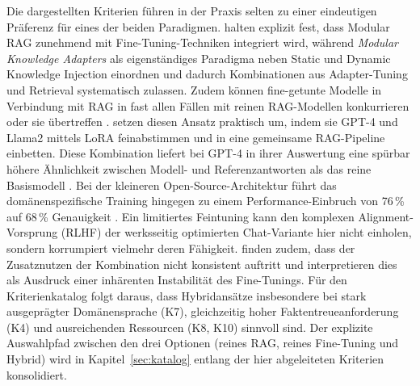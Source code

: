 Die dargestellten Kriterien führen in der Praxis selten zu einer eindeutigen Präferenz für eines der beiden Paradigmen.
\textcite[6]{Gao.2024} halten explizit fest, dass Modular RAG zunehmend mit Fine-Tuning-Techniken integriert wird, während
\textcite[3f]{Song.2025} \textit{Modular Knowledge Adapters} als eigenständiges Paradigma neben Static und Dynamic Knowledge Injection einordnen und dadurch Kombinationen aus Adapter-Tuning und Retrieval systematisch zulassen.
Zudem können fine-getunte Modelle in Verbindung mit RAG in fast allen Fällen mit reinen RAG-Modellen konkurrieren oder sie übertreffen \autocite[2]{Soudani.2024}.
\textcite[10, 21]{Balaguer.2024} setzen diesen Ansatz praktisch um, indem sie GPT-4 und Llama2 mittels LoRA feinabstimmen und in eine gemeinsame RAG-Pipeline einbetten. Diese Kombination liefert bei GPT-4 in ihrer Auswertung eine spürbar höhere Ähnlichkeit zwischen Modell- und Referenzantworten als das reine Basismodell \autocite[27]{Balaguer.2024}. Bei der kleineren Open-Source-Architektur führt das domänenspezifische Training hingegen zu einem Performance-Einbruch von 76\,\% auf 68\,\% Genauigkeit \autocite[26]{Balaguer.2024}. Ein limitiertes Feintuning kann den komplexen Alignment-Vorsprung (RLHF) der werksseitig optimierten Chat-Variante \autocite[8]{Touvron.2023} hier nicht einholen, sondern korrumpiert vielmehr deren Fähigkeit.
\textcite[7]{Ovadia.2024} finden zudem, dass der Zusatznutzen der Kombination nicht konsistent auftritt und interpretieren dies als Ausdruck einer inhärenten Instabilität des Fine-Tunings.
Für den Kriterienkatalog folgt daraus, dass Hybridansätze insbesondere bei stark ausgeprägter Domänensprache (K7), gleichzeitig hoher Faktentreueanforderung (K4) und ausreichenden Ressourcen (K8, K10) sinnvoll sind. Der explizite Auswahlpfad zwischen den drei Optionen (reines RAG, reines Fine-Tuning und Hybrid) wird in Kapitel~\ref{sec:katalog} entlang der hier abgeleiteten Kriterien konsolidiert.
